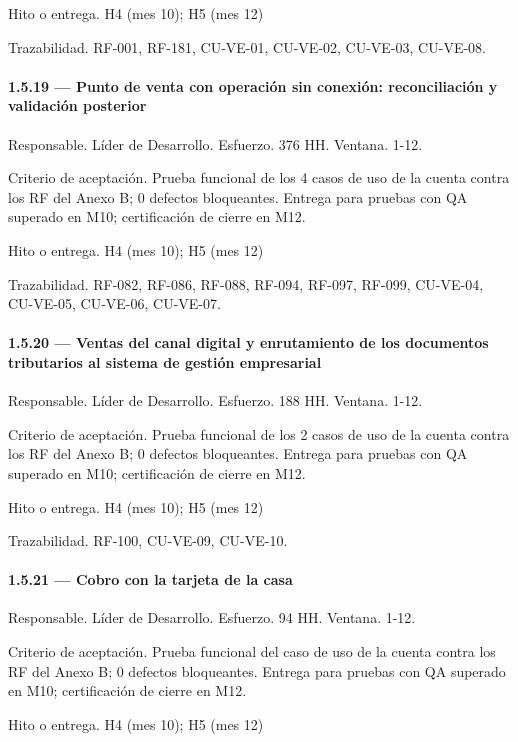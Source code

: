 \documentclass[11pt]{article}
\begin{document}
Hito o entrega. H4 (mes 10); H5 (mes 12)

Trazabilidad. RF-001, RF-181, CU-VE-01, CU-VE-02, CU-VE-03, CU-VE-08.

\paragraph{1.5.19 — Punto de venta con operación sin conexión: reconciliación y validación posterior}

Responsable. Líder de Desarrollo. Esfuerzo. 376 HH. Ventana. 1-12.

Criterio de aceptación. Prueba funcional de los 4 casos de uso de la cuenta contra los RF del Anexo B; 0 defectos bloqueantes. Entrega para pruebas con QA superado en M10; certificación de cierre en M12.

Hito o entrega. H4 (mes 10); H5 (mes 12)

Trazabilidad. RF-082, RF-086, RF-088, RF-094, RF-097, RF-099, CU-VE-04, CU-VE-05, CU-VE-06, CU-VE-07.

\paragraph{1.5.20 — Ventas del canal digital y enrutamiento de los documentos tributarios al sistema de gestión empresarial}

Responsable. Líder de Desarrollo. Esfuerzo. 188 HH. Ventana. 1-12.

Criterio de aceptación. Prueba funcional de los 2 casos de uso de la cuenta contra los RF del Anexo B; 0 defectos bloqueantes. Entrega para pruebas con QA superado en M10; certificación de cierre en M12.

Hito o entrega. H4 (mes 10); H5 (mes 12)

Trazabilidad. RF-100, CU-VE-09, CU-VE-10.

\paragraph{1.5.21 — Cobro con la tarjeta de la casa}

Responsable. Líder de Desarrollo. Esfuerzo. 94 HH. Ventana. 1-12.

Criterio de aceptación. Prueba funcional del caso de uso de la cuenta contra los RF del Anexo B; 0 defectos bloqueantes. Entrega para pruebas con QA superado en M10; certificación de cierre en M12.

Hito o entrega. H4 (mes 10); H5 (mes 12)
\end{document}
